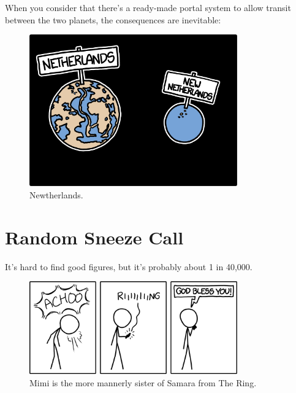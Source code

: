 {{When you consider that there's a ready-made portal system to allow transit between the two planets, the consequences are inevitable:}

\begin{figure}[!htbp]
\centering
\includegraphics[scale=0.5, max width=0.8\textwidth]{imgs/a/54/mars_netherlands.png}
\caption{Newtherlands.}
\end{figure}

{
\chapter{Random Sneeze Call}
}

\hfill{}

{It's hard to find good figures, but it's probably about 1 in 40,000.}

\begin{figure}[!htbp]
\centering
\includegraphics[scale=0.5, max width=0.8\textwidth]{imgs/a/55/sneeze_success.png}
\caption{Mimi is the more mannerly sister of Samara from The Ring.}
\end{figure}

}

